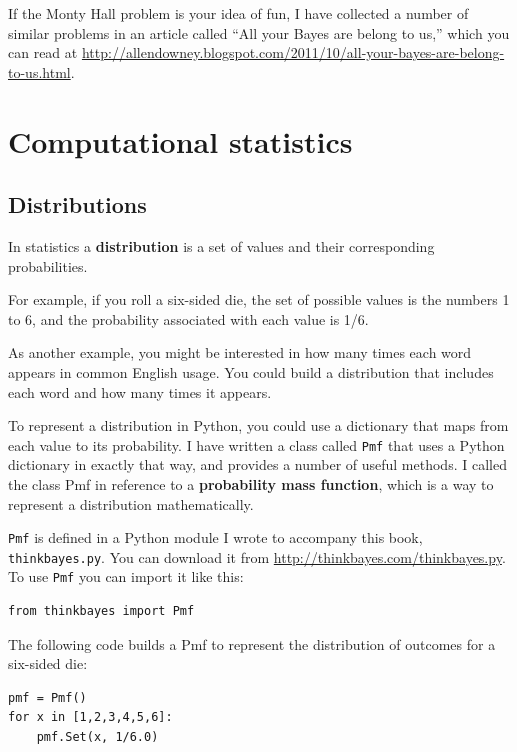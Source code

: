 \documentclass[12pt]{book}
\begin{document}
If the Monty Hall problem is your idea of fun, I have collected a
number of similar problems in an article called ``All your Bayes are
belong to us,'' which you can read at
\url{http://allendowney.blogspot.com/2011/10/all-your-bayes-are-belong-to-us.html}.


\chapter{Computational statistics}
\label{compstat}

\section{Distributions}

In statistics a {\bf distribution} is a set of values and their
corresponding probabilities.

For example, if you roll a six-sided die, the set of possible
values is the numbers 1 to 6, and the probability associated
with each value is 1/6.

As another example, you might be interested in how many times each
word appears in common English usage.  You could build a distribution
that includes each word and how many times it appears.

To represent a distribution in Python, you could use a dictionary that
maps from each value to its probability.  I have written a class
called {\tt Pmf} that uses a Python dictionary in exactly that way,
and provides a number of useful methods.
I called the class Pmf in reference to 
a {\bf probability mass function}, which is a way to
represent a distribution mathematically.

{\tt Pmf} is defined in a Python module I wrote to accompany this
book, {\tt thinkbayes.py}.  You can download it from
\url{http://thinkbayes.com/thinkbayes.py}.  To use {\tt Pmf} you
can import it like this:

\begin{verbatim}
from thinkbayes import Pmf
\end{verbatim}

The following code builds a Pmf to represent the distribution
of outcomes for a six-sided die:

\begin{verbatim}
pmf = Pmf()
for x in [1,2,3,4,5,6]:
    pmf.Set(x, 1/6.0)
\end{verbatim}
\end{document}
